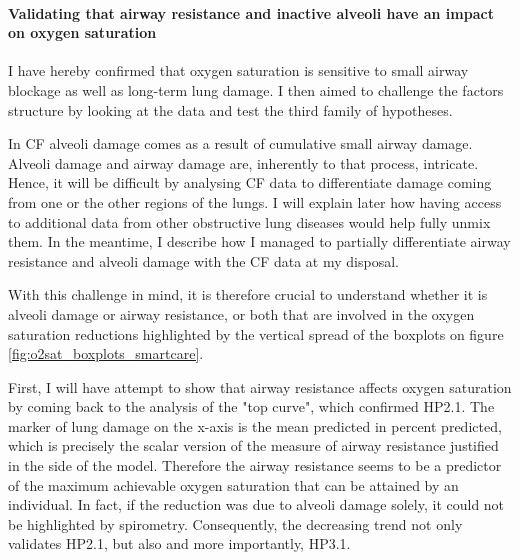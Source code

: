 \paragraph{Validating that airway resistance and inactive alveoli have an impact on oxygen saturation}
I have hereby confirmed that oxygen saturation is sensitive to small airway blockage as well as long-term lung damage. I then aimed to challenge the factors structure by looking at the data and test the third family of hypotheses. 


In CF alveoli damage comes as a result of cumulative small airway damage. Alveoli damage and airway damage are, inherently to that process, intricate. Hence, it will be difficult by analysing CF data to differentiate damage coming from one or the other regions of the lungs. I will explain later how having access to additional data from other obstructive lung diseases would help fully unmix them. In the meantime, I describe how I managed to partially differentiate airway resistance and alveoli damage with the CF data at my disposal. 

With this challenge in mind, it is therefore crucial to understand whether it is alveoli damage or airway resistance, or both that are involved in the oxygen saturation reductions highlighted by the vertical spread of the boxplots on figure \ref{fig:o2sat_boxplots_smartcare}. 

First, I will have attempt to show that airway resistance affects oxygen saturation by coming back to the analysis of the "top curve", which confirmed HP2.1. The marker of lung damage on the x-axis is the mean predicted \F in percent predicted, which is precisely the scalar version of the measure of airway resistance justified in the \F side of the model. Therefore the airway resistance seems to be a predictor of the maximum achievable oxygen saturation that can be attained by an individual. In fact, if the reduction was due to alveoli damage solely, it could not be highlighted by spirometry. Consequently, the decreasing trend not only validates HP2.1, but also and more importantly, HP3.1. 

